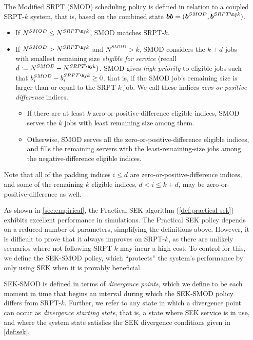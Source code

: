 \documentclass[acmsmall]{acmart}
\newcommand{\bb}{\boldsymbol{b}}
\newcommand{\bbb}{\bb\bb}
\begin{document}
\begin{definition}
    \label{def:smod}
    The Modified SRPT (SMOD) scheduling policy is defined in relation to a coupled SRPT-$k$ system, that is, based on the combined state $\bbb=(\bb^{SMOD},\bb^{SRPT\hy k})$. 
    \begin{itemize}
        \item If $N^{SMOD}\leq N^{SRPT \hy k}$, SMOD matches SRPT-$k$.

        \item If $N^{SMOD}> N^{SRPT \hy k}$ and $N^{SMOD}>k$, SMOD considers the $k+d$ jobs with smallest remaining size \textit{eligible for service} (recall $d := N^{SMOD} - N^{SRPT\hy k})$. 
        SMOD gives \textit{high priority} to eligible jobs such that $b_i^{SMOD} - b_i^{SRPT\hy k}\geq 0$, that is, if the SMOD job's remaining size is larger than or equal to the SRPT-$k$ job. We call these indices \textit{zero-or-positive difference} indices.
    \begin{itemize}
        \item If there are at least $k$ zero-or-positive-difference eligible indices, SMOD serves the $k$ jobs with least remaining size among them.
        \item Otherwise, SMOD serves all the zero-or-positive-difference eligible indices, and fills the remaining servers with the least-remaining-size jobs among the negative-difference eligible indices.
    \end{itemize}
    \end{itemize}
 \end{definition}

Note that all of the padding indices $i \le d$ are zero-or-positive-difference indices, and some of the remaining $k$ eligible indices, $d < i \le k+d$, may be zero-or-positive-difference as well.


As shown in \cref{sec:empirical}, the Practical SEK algorithm (\cref{def:practical-sek}) exhibits excellent performance in simulations. The Practical SEK policy depends on a reduced number of parameters, simplifying the definitions above. However, it is difficult to prove that it always improves on SRPT-$k$,
as there are unlikely scenarios where not following SRPT-$k$ may incur a high cost.
To control for this, we define the SEK-SMOD policy, which ``protects'' the system's performance by only using SEK when it is provably beneficial. 

SEK-SMOD is defined in terms of \textit{divergence points}, which we define to be each moment in time that begins an interval during which the SEK-SMOD policy differs from SRPT-$k$. Further, we refer to any state in which a divergence point can occur as \textit{divergence starting state}, that is,
a state where SEK service is in use, and where the system state satisfies the SEK divergence conditions given in \cref{def:sek}.
\end{document}
